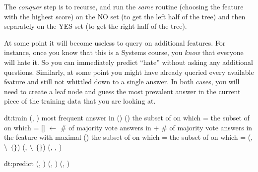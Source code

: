 The \emph{conquer} step is to recurse, and run the \emph{same}
routine (choosing the feature with the highest score) on the NO set
(to get the left half of the tree) and then separately on the YES set
(to get the right half of the tree).

At some point it will become useless to query on additional features.
For instance, once you know that this is a Systems course, you
\emph{know} that everyone will hate it.  So you can immediately
predict ``hate'' without asking any additional questions.  Similarly,
at some point you might have already queried every available feature
and still not whittled down to a single answer.  In both cases, you
will need to create a leaf node and guess the most prevalent answer in
the current piece of the training data that you are looking at.


\newalgorithm%
  {dt:train}%
  {(, )}%
  {
 most frequent answer in  
\RETURN {}() 
\RETURN {}() 
 the subset of  on which =
 the subset of  on which =
\STATE {}[] $\leftarrow$ \# of majority vote answers in 
\STATE \quad\quad\quad\quad + \# of majority vote answers in \\
\ENDFOR
{} the feature with maximal ()
 the subset of  on which =
 the subset of  on which =
 (,  $\backslash$ $\{$$\}$)
 (,  $\backslash$ $\{$$\}$)
\RETURN {}(, , )
\ENDIF
}

\newalgorithm%
  {dt:predict}%
  {(, )}
  {
\RETURN {}
\RETURN {}(, )
\ELSE
\RETURN {}(, )
\ENDIF
\ENDIF
}

